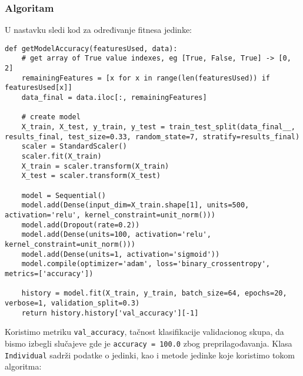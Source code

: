 \documentclass[11pt]{article} %
\begin{document}
\subsubsection{Algoritam}
U nastavku sledi kod za određivanje fitnesa jedinke:

\begin{lstlisting}
def getModelAccuracy(featuresUsed, data):
    # get array of True value indexes, eg [True, False, True] -> [0, 2]
    remainingFeatures = [x for x in range(len(featuresUsed)) if featuresUsed[x]]
    data_final = data.iloc[:, remainingFeatures]
    
    # create model
    X_train, X_test, y_train, y_test = train_test_split(data_final__, results_final, test_size=0.33, random_state=7, stratify=results_final)
    scaler = StandardScaler()
    scaler.fit(X_train)
    X_train = scaler.transform(X_train)
    X_test = scaler.transform(X_test)
    
    model = Sequential()
    model.add(Dense(input_dim=X_train.shape[1], units=500, activation='relu', kernel_constraint=unit_norm()))
    model.add(Dropout(rate=0.2))
    model.add(Dense(units=100, activation='relu', kernel_constraint=unit_norm()))
    model.add(Dense(units=1, activation='sigmoid'))
    model.compile(optimizer='adam', loss='binary_crossentropy', metrics=['accuracy'])
    
    history = model.fit(X_train, y_train, batch_size=64, epochs=20, verbose=1, validation_split=0.3)
    return history.history['val_accuracy'][-1]
\end{lstlisting}

Koristimo metriku \lstinline{val_accuracy}, tačnost klasifikacije validacionog skupa, da bismo izbegli slučajeve gde je \lstinline{accuracy = 100.0} zbog preprilagođavanja.\newline
Klasa \lstinline{Individual} sadrži podatke o jedinki, kao i metode jedinke koje koristimo tokom algoritma:
\end{document}
